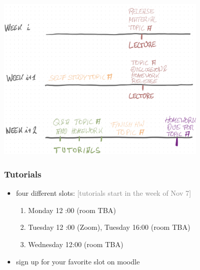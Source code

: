 \documentclass[fleqn,10pt,serif,xcolor=svgnames,xcolor=table,aspectratio=169,handout]{beamer}
\newcommand{\mycom}[1]{\hfill {\mygray{[#1]}}}
\newcommand{\mygray}[1]{\textcolor{gray}{#1}}
\begin{document}
\begin{frame}

  \begin{center}
    \includegraphics[width=0.75\textwidth]{00-introduction-pics/timing-logic.png}
  \end{center}

\end{frame}

\begin{frame}
  \frametitle{Tutorials}
  \begin{itemize}
    \item four different slots: \hfill \mycom{tutorials start in the week of Nov 7}
    \begin{enumerate}
      \item {} Monday 12   :00 (room TBA)
      \item {}   Tuesday 12  :00 (Zoom), Tuesday 16:00 (room TBA)
      \item {}           Wednesday 12:00 (room TBA)
    \end{enumerate}
    \item sign up for your favorite slot on moodle
  \end{itemize}
\end{frame}
\end{document}
